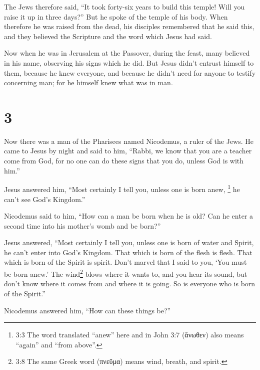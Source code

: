  The Jews therefore said, ``It took forty-six years to
build this temple! Will you raise it up in three days?'' 
But he spoke of the temple of his body.  When therefore he
was raised from the dead, his disciples remembered that he said this,
and they believed the Scripture and the word which Jesus had said.

 Now when he was in Jerusalem at the Passover, during the
feast, many believed in his name, observing his signs which he did.
 But Jesus didn't entrust himself to them, because he knew
everyone,  and because he didn't need for anyone to testify
concerning man; for he himself knew what was in man.

\hypertarget{section-2}{%
\section{3}\label{section-2}}

 Now there was a man of the Pharisees named Nicodemus, a
ruler of the Jews.  He came to Jesus by night and said to
him, ``Rabbi, we know that you are a teacher come from God, for no one
can do these signs that you do, unless God is with him.''

 Jesus answered him, ``Most certainly I tell you, unless one
is born anew, \footnote{3:3 The word translated ``anew'' here and in
  John 3:7 (ἄνωθεν) also means ``again'' and ``from above''.} he can't
see God's Kingdom.''

 Nicodemus said to him, ``How can a man be born when he is
old? Can he enter a second time into his mother's womb and be born?''

 Jesus answered, ``Most certainly I tell you, unless one is
born of water and Spirit, he can't enter into God's Kingdom.
 That which is born of the flesh is flesh. That which is
born of the Spirit is spirit.  Don't marvel that I said to
you, `You must be born anew.'  The wind\footnote{3:8 The
  same Greek word (πνεῦμα) means wind, breath, and spirit.} blows where
it wants to, and you hear its sound, but don't know where it comes from
and where it is going. So is everyone who is born of the Spirit.''

 Nicodemus answered him, ``How can these things be?''

